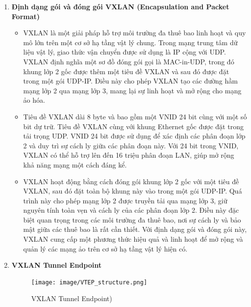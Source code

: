 \documentclass[13pt]{article}
\begin{document}
\begin{enumerate}
    \item \textbf{Định dạng gói và đóng gói VXLAN (Encapsulation and Packet Format)}
    \begin{itemize}
        \item VXLAN là một giải pháp hỗ trợ môi trường đa thuê bao linh hoạt và quy mô lớn trên một cơ sở hạ tầng vật lý chung. Trong mạng trung tâm dữ liệu vật lý, giao thức vận chuyển được sử dụng là IP cộng với UDP. VXLAN định nghĩa một sơ đồ đóng gói gọi là MAC-in-UDP, trong đó khung lớp 2 gốc được thêm một tiêu đề VXLAN và sau đó được đặt trong một gói UDP-IP. Điều này cho phép VXLAN tạo các đường hầm mạng lớp 2 qua mạng lớp 3, mang lại sự linh hoạt và mở rộng cho mạng ảo hóa.
        \item Tiêu đề VXLAN dài 8 byte và bao gồm một VNID 24 bit cùng với một số bit dự trữ. Tiêu đề VXLAN cùng với khung Ethernet gốc được đặt trong tải trọng UDP. VNID 24 bit được sử dụng để xác định các phân đoạn lớp 2 và duy trì sự cách ly giữa các phân đoạn này. Với 24 bit trong VNID, VXLAN có thể hỗ trợ lên đến 16 triệu phân đoạn LAN, giúp mở rộng khả năng mạng một cách đáng kể.
        \item VXLAN hoạt động bằng cách đóng gói khung lớp 2 gốc với một tiêu đề VXLAN, sau đó đặt toàn bộ khung này vào trong một gói UDP-IP. Quá trình này cho phép mạng lớp 2 được truyền tải qua mạng lớp 3, giữ nguyên tính toàn vẹn và cách ly của các phân đoạn lớp 2. Điều này đặc biệt quan trọng trong các môi trường đa thuê bao, nơi sự cách ly và bảo mật giữa các thuê bao là rất cần thiết. Với định dạng gói và đóng gói này, VXLAN cung cấp một phương thức hiệu quả và linh hoạt để mở rộng và quản lý các mạng ảo trên cơ sở hạ tầng vật lý hiện có.
    \end{itemize}

    \item \textbf{VXLAN Tunnel Endpoint}
    \begin{figure}[h!]
        \centering
        \texttt{[image: image/VTEP\_structure.png]}
            \caption{VXLAN Tunnel Endpoint)}
            \label{fig:label1}
    \end{figure}
    

\end{enumerate}
\end{document}
